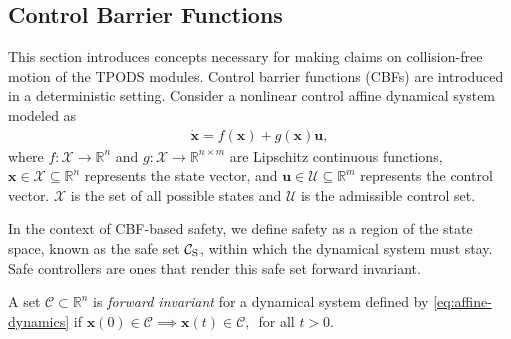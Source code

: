 \subsection{Control Barrier Functions} \label{sec:cbf}
This section introduces concepts necessary for making claims on collision-free motion of the TPODS modules. Control barrier functions (CBFs) are introduced in a deterministic setting. Consider a nonlinear control affine dynamical system modeled as
\begin{align} \label{eq:affine-dynamics}
    \dot{\boldsymbol{x}} = f(\boldsymbol{x}) + g(\boldsymbol{x})\boldsymbol{u},
\end{align}
where $f:\mathcal{X} \rightarrow \mathbb{R}^n$ and $g:\mathcal{X} \rightarrow \mathbb{R}^{n \times m}$ are Lipschitz continuous functions, $\boldsymbol{x} \in \mathcal{X} \subseteq \mathbb{R}^n$ represents the state vector, and $\boldsymbol{u} \in \mathcal{U} \subseteq \mathbb{R}^m$ represents the control vector. $\mathcal{X}$ is the set of all possible states and $\mathcal{U}$ is the admissible control set.

In the context of CBF-based safety, we define safety as a region of the state space, known as the safe set $\mathcal{C}_{\rm S}$, within which the dynamical system must stay. Safe controllers are ones that render this safe set forward invariant.

\begin{definition} \label{def:forward_inv}
A set $\mathcal{C} \subset \mathbb{R}^n$ is \textit{forward invariant} for a dynamical system defined by \eqref{eq:affine-dynamics} if $\boldsymbol{x}(0) \in \mathcal{C} \implies \boldsymbol{x}(t) \in \mathcal{C}, \,$ for all $t > 0$.
\end{definition}

